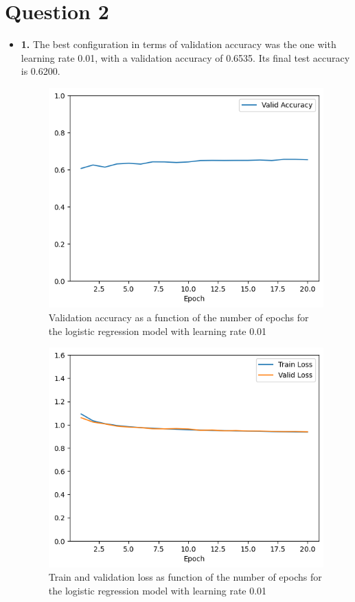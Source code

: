 \documentclass[12pt]{article}
\begin{document}
\section*{Question 2}
\begin{itemize}
    \item \textbf{1.} The best configuration in terms of validation accuracy was the one with learning rate 0.01, with a validation accuracy of 0.6535. Its final test accuracy is 0.6200.
          \begin{figure}[H]
              \centering
              \includegraphics[width=0.5\linewidth]{../outputs/hw1-q2-1-acc.01.png}
              \caption{Validation accuracy as a function of the number of epochs for the logistic regression model with learning rate 0.01}
              \label{fig:2.1:acc}
          \end{figure}

          \begin{figure}[H]
              \centering
              \includegraphics[width=0.5\linewidth]{../outputs/hw1-q2-1-loss.01.png}
              \caption{Train and validation loss as function of the number of epochs for the logistic regression model with learning rate 0.01}
              \label{fig:2.1:loss}
          \end{figure}


\end{itemize}
\end{document}
